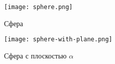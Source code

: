     \begin{paracol}{2}
        \begin{column}
            \vspace*{\fill}
            \begin{figure}[h]
                \centering
                \texttt{[image: sphere.png]}
                \caption{Сфера}
                \label{fig:sphere}
            \end{figure}

            \begin{figure}[h]
                \centering
                \texttt{[image: sphere-with-plane.png]}
                \caption{Сфера с плоскостью $\alpha$}
                \label{fig:sphere-with-plane}
            \end{figure}
            \vspace*{\fill}
        \end{column}


\end{paracol}
